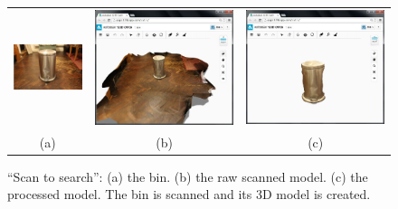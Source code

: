 \begin{figure}
\begin{center}
\begin{tabular}{ccc}   %
   \includegraphics[height=0.23\columnwidth]{input_bin_photo_scantosearch_test}& 
   \includegraphics[height=0.23\columnwidth]{input_bin_rawscanned_scantosearch_test}&
   \includegraphics[height=0.23\columnwidth]{input_bin_scanned_scantosearch_test}\\
   (a) & (b) & (c)
\end{tabular}
\caption{``Scan to search'': (a) the bin. (b) the raw scanned model. (c) the processed model. The bin is scanned and its 3D model is created. } 
  \label{scantosearchtest_bin_scanning}
\end{center}
\end{figure}

